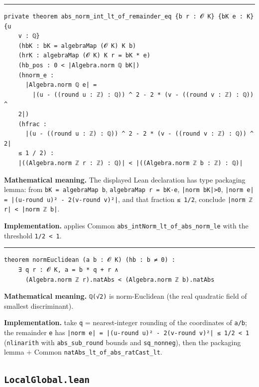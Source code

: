 \documentclass[UTF8,a4paper,11pt,fontset=fandol]{ctexart}
\theoremstyle{definition}
\newcommand{\statementsep}{\par\medskip\hrule\medskip}
\begin{document}
\statementsep
\begin{verbatim}
private theorem abs_norm_int_lt_of_remainder_eq {b r : 𝓞 K} {bK e : K} {u
    v : ℚ}
    (hbK : bK = algebraMap (𝓞 K) K b)
    (hrK : algebraMap (𝓞 K) K r = bK * e)
    (hb_pos : 0 < |Algebra.norm ℚ bK|)
    (hnorm_e :
      |Algebra.norm ℚ e| =
        |(u - ((round u : ℤ) : ℚ)) ^ 2 - 2 * (v - ((round v : ℤ) : ℚ)) ^
    2|)
    (hfrac :
      |(u - ((round u : ℤ) : ℚ)) ^ 2 - 2 * (v - ((round v : ℤ) : ℚ)) ^ 2|
    ≤ 1 / 2) :
    |((Algebra.norm ℤ r : ℤ) : ℚ)| < |((Algebra.norm ℤ b : ℤ) : ℚ)|
\end{verbatim}
\noindent\textbf{Mathematical meaning.} The displayed Lean declaration has type packaging lemma: from \texttt{bK = algebraMap b}, \texttt{algebraMap r = bK·e}, \texttt{|norm bK|>0}, \texttt{|norm e| = |(u-round u)² - 2(v-round v)²|}, and that fraction \texttt{≤ 1/\allowbreak{}2}, conclude \texttt{|norm ℤ r| < |norm ℤ b|}.\par
\noindent\textbf{Implementation.} applies Common \texttt{abs\_\allowbreak{}intNorm\_\allowbreak{}lt\_\allowbreak{}of\_\allowbreak{}abs\_\allowbreak{}norm\_\allowbreak{}le} with the threshold \texttt{1/\allowbreak{}2 < 1}.\par
\statementsep
\begin{verbatim}
theorem normEuclidean (a b : 𝓞 K) (hb : b ≠ 0) :
    ∃ q r : 𝓞 K, a = b * q + r ∧
      (Algebra.norm ℤ r).natAbs < (Algebra.norm ℤ b).natAbs
\end{verbatim}
\noindent\textbf{Mathematical meaning.} \texttt{ℚ(√2)} is norm-Euclidean (the real quadratic field of smallest discriminant).\par
\noindent\textbf{Implementation.} take \texttt{q} = nearest-integer rounding of the coordinates of \texttt{a/\allowbreak{}b}; the remainder \texttt{e} has \texttt{|norm e| = |(u-round u)² - 2(v-round v)²| ≤ 1/\allowbreak{}2 < 1} (\texttt{nlinarith} with \texttt{abs\_\allowbreak{}sub\_\allowbreak{}round} bounds and \texttt{sq\_\allowbreak{}nonneg}), then the packaging lemma + Common \texttt{natAbs\_\allowbreak{}lt\_\allowbreak{}of\_\allowbreak{}abs\_\allowbreak{}ratCast\_\allowbreak{}lt}.\par

\subsection{\texttt{LocalGlobal.lean}}
\end{document}
